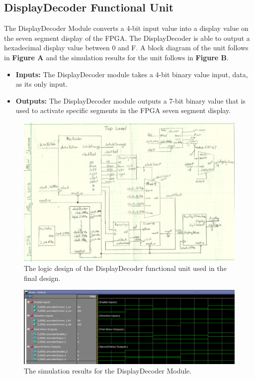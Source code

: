 \documentclass[a4paper]{article}
\begin{document}
\subsection{DisplayDecoder Functional Unit}
The DisplayDecoder Module converts a 4-bit input value into a display value on the seven segment display of the FPGA. The DisplayDecoder is
able to output a hexadecimal display value between 0 and F. A block diagram of the unit follows in \textbf{Figure A} and the simulation results for the unit follows in \textbf{Figure B}.
\begin{itemize}
  \item \textbf{Inputs:  } The DisplayDecoder module takes a 4-bit binary value input, data, as its only input.
  \item \textbf{Outputs: } The DisplayDecoder module outputs a 7-bit binary value that is used to activate specific segments in the FPGA seven segment display.
\end{itemize}
\begin{figure}[h]
  \centering
    \includegraphics[width=.8\textwidth]{images/functional_1.png}
	\caption{The logic design of the DisplayDecoder functional unit used in the final design.}
    \label{fig:functional-1}
\end{figure}
\begin{figure}[h]
  \centering
    \includegraphics[width=.98\textwidth]{sims/functional_1.png}
	\caption{The simulation results for the DisplayDecoder Module.}
    \label{fig:top-level-sim}
\end{figure}
\end{document}
